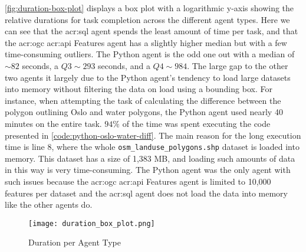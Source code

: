 \autoref{fig:duration-box-plot} displays a box plot with a logarithmic y-axis showing the relative durations for task completion across the different agent types. Here we can see that the \acrshort{acr:sql} agent spends the least amount of time per task, and that the \acrshort{acr:ogc} \acrshort{acr:api} Features agent has a slightly higher median but with a few time-consuming outliers. The Python agent is the odd one out with a median of $\sim 82$ seconds, a $Q3 \sim 293$ seconds, and a $Q4 \sim 984$. The large gap to the other two agents it largely due to the Python agent's tendency to load large datasets into memory without filtering the data on load using a bounding box. For instance, when attempting the task of calculating the difference between the polygon outlining Oslo and water polygons, the Python agent used nearly 40 minutes on the entire task. $94\%$ of the time was spent executing the code presented in \autoref{code:python-oslo-water-diff}. The main reason for the long execution time is line 8, where the whole \texttt{osm\_landuse\_polygons.shp} dataset is loaded into memory. This dataset has a size of 1,383 MB, and loading such amounts of data in this way is very time-consuming. The Python agent was the only agent with such issues because the \acrshort{acr:ogc} \acrshort{acr:api} Features agent is limited to 10,000 features per dataset and the \acrshort{acr:sql} agent does not load the data into memory like the other agents do.

\begin{figure}[htbp]
    \centering
    \texttt{[image: duration\_box\_plot.png]}
    \caption{Duration per Agent Type}
    \label{fig:duration-box-plot}
\end{figure}

\FloatBarrier

